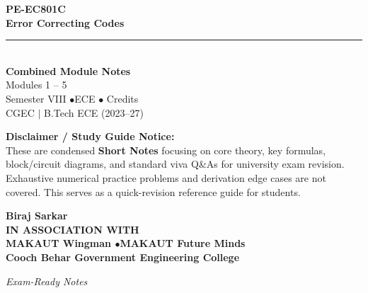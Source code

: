 \documentclass[12pt,a4paper]{article}
\begin{document}
\thispagestyle{empty}


\vspace*{1.0cm}
\begin{center}
  {\Huge\bfseries\color{myred} PE-EC801C}\\[10pt]
  {\LARGE\bfseries\color{mydark} Error Correcting Codes}\\[20pt]
  {\color{myred}\rule{0.7\linewidth}{1.5pt}}\\[18pt]
  {\Large\color{myteal}\textbf{Combined Module Notes}}\\[8pt]
  {\large\color{mydark} Modules 1 -- 5}\\[40pt]
  {\normalsize\color{mydark} Semester VIII \quad$\bullet$\quad ECE \quad$\bullet$ Credits}\\[12pt]
  {\normalsize\color{mydark} CGEC \;$|$\; B.Tech ECE (2023--27)}
\end{center}
\vspace{1.0cm}
\begin{center}
  \begin{tcolorbox}[colback=mygray, colframe=mgframe, boxrule=0.5pt, arc=3pt, width=0.85\linewidth]
    \centering\small\color{mydark}
    \textbf{Disclaimer / Study Guide Notice:}\\
    These are condensed \textbf{Short Notes} focusing on core theory, key formulas, block/circuit diagrams, and standard viva Q\&As for university exam revision. Exhaustive numerical practice problems and derivation edge cases are not covered. This serves as a quick-revision reference guide for students.
  \end{tcolorbox}
\end{center}
\vfill
\vspace{0.6cm}
\begin{center}
  {\large\bfseries\color{mypurple} Biraj Sarkar}\\[16pt]
  {\footnotesize\color{watermark}\textbf{IN ASSOCIATION WITH}}\\[8pt]
  {\small\bfseries\color{mydark} MAKAUT Wingman \quad$\bullet$\quad MAKAUT Future Minds}\\[12pt]
  {\large\bfseries\color{myteal} Cooch Behar Government Engineering College}
\end{center}
\vfill
\begin{center}{\small\color{watermark}\textit{Exam-Ready Notes}}\end{center}
\clearpage
\end{document}
